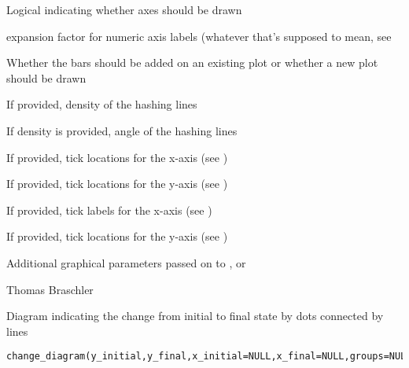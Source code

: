 \documentclass[a4paper]{book}
\begin{document}
\begin{Arguments}
\begin{ldescription}
\item[\code{axes}] 
Logical indicating whether axes should be drawn


\item[\code{cex.axis}] 
expansion factor for numeric axis labels (whatever that's supposed to mean, see 

\item[\code{plot.new}] 
Whether the bars should be added on an existing plot or whether a new plot should be drawn

\item[\code{density}] 
If provided, density of the hashing lines

\item[\code{angle}] 
If density is provided, angle of the hashing lines

\item[\code{at\_x}] If provided, tick locations for the x-axis (see )
\item[\code{at\_y}] If provided, tick locations for the y-axis (see )
\item[\code{labels\_x}] If provided, tick labels for the x-axis (see )
\item[\code{labels\_y}] If provided, tick locations for the y-axis (see )
\item[\code{...}] 
Additional graphical parameters passed on to ,  or 

\end{ldescription}
\end{Arguments}
%
\begin{Author}\relax
Thomas Braschler
\end{Author}
%
\begin{Description}\relax
Diagram indicating the change from initial to final state by dots connected by lines
\end{Description}
%
\begin{Usage}
\begin{verbatim}
change_diagram(y_initial,y_final,x_initial=NULL,x_final=NULL,groups=NULL,plot.new=TRUE,...)
\end{verbatim}
\end{Usage}
%
\end{document}
